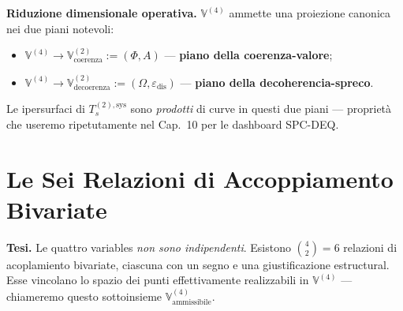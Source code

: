 \Hypoth{} \textbf{Riduzione dimensionale operativa.}
\(\mathbb{V}^{(4)}\) ammette una proiezione canonica nei due piani
notevoli:

\begin{itemize}
\tightlist
\item
  \(\mathbb{V}^{(4)} \to \mathbb{V}^{(2)}_{\text{coerenza}} := (\Phi, A)\)
  --- \textbf{piano della coerenza-valore};
\item
  \(\mathbb{V}^{(4)} \to \mathbb{V}^{(2)}_{\text{decoerenza}} := (\Omega, \varepsilon_{\text{dis}})\)
  --- \textbf{piano della decoherencia-spreco}.
\end{itemize}

Le ipersurfaci di \(T_s^{(2),\text{sys}}\) sono \emph{prodotti} di curve
in questi due piani --- proprietà che useremo ripetutamente nel Cap.~10
per le dashboard SPC-DEQ.



\section{Le Sei Relazioni di Accoppiamento
Bivariate}\label{le-sei-relazioni-di-acoplamiento-bivariate}

\Hypoth{} \textbf{Tesi.} Le quattro variables \emph{non sono
indipendenti}. Esistono \(\binom{4}{2} = 6\) relazioni di acoplamiento
bivariate, ciascuna con un segno e una giustificazione estructural. Esse
vincolano lo spazio dei punti effettivamente realizzabili in
\(\mathbb{V}^{(4)}\) --- chiameremo questo sottoinsieme
\(\mathbb{V}^{(4)}_{\text{ammissibile}}\).

